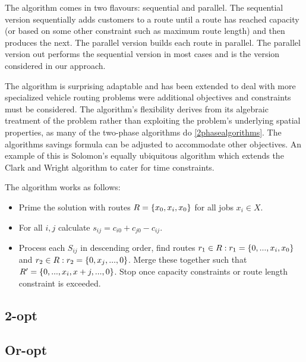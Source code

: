 The algorithm comes in two flavours: sequential and parallel. The sequential version sequentially adds customers to a route until a route has reached capacity (or based on some other constraint such as maximum route length) and then produces the next. The parallel version builds each route in parallel. The parallel version out performs the sequential version in most cases\cite{Laporte:1999} and is the version considered in our approach.

The algorithm is surprising adaptable and has been extended to deal with more specialized vehicle routing problems were additional objectives and constraints must be considered. The algorithm's flexibility derives from its algebraic treatment of the problem rather than exploiting the problem's underlying spatial properties, as many of the two-phase algorithms do \ref{2phasealgorithms}. The algorithms savings formula can be adjusted to accommodate other objectives. An example of this is Solomon's equally ubiquitous algorithm \cite{Solomon:1987} which extends the Clark and Wright algorithm to cater for time constraints. 

The algorithm works as follows:

\begin{itemize}
	\item Prime the solution with routes $R = \{x_0, x_i, x_0\}$ for all jobs $x_i \in X$.
	\item For all $i,j$ calculate $s_{ij} = c_{i0} + c_{j0} - c_{ij}$.
	\item Process each $S_{ij}$ in descending order, find routes $r_1 \in R : r_1 = \{0,...,x_i,x_0\}$ and $r_2 \in R: r_2 = \{0,x_j,...,0\}$. Merge these together such that $R' = \{0,...,x_i, x+j,...,0\}$. Stop once capacity constraints or route length constraint is exceeded.
\end{itemize}


\subsection{2-opt}

\subsection{Or-opt}


